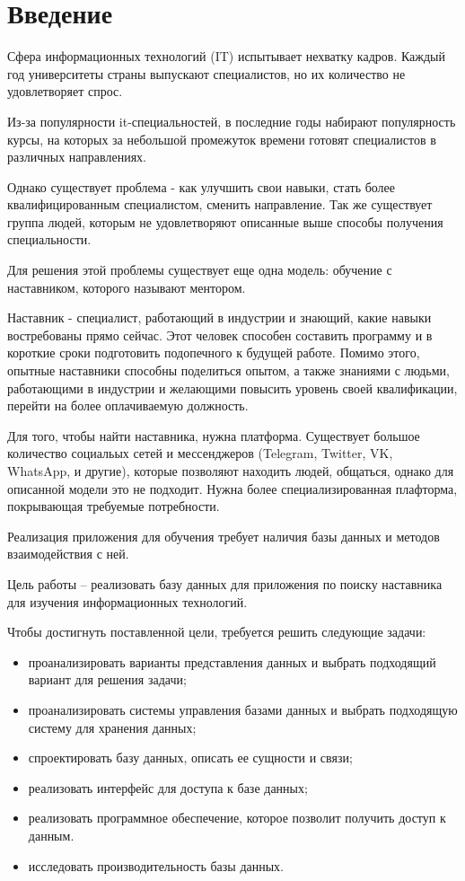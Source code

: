 \chapter*{Введение}

Сфера информационных технологий (IT) испытывает нехватку кадров. Каждый год университеты страны выпускают специалистов, но их
количество не удовлетворяет спрос.

Из-за популярности it-специальностей, в последние годы набирают популярность курсы, на которых за небольшой промежуток времени
готовят специалистов в различных направлениях.

Однако существует проблема - как улучшить свои навыки, стать более квалифицированным специалистом, сменить направление.
Так же существует группа людей, которым не удовлетворяют описанные выше способы получения специальности.

Для решения этой проблемы существует еще одна модель: обучение с наставником, которого называют ментором.

Наставник - специалист, работающий в индустрии и знающий, какие навыки востребованы прямо сейчас. Этот человек
способен составить программу и в короткие сроки подготовить подопечного к будущей работе.
Помимо этого, опытные наставники способны поделиться опытом, а также знаниями с людьми, работающими в индустрии и желающими
повысить уровень своей квалификации, перейти на более оплачиваемую должность.

Для того, чтобы найти наставника, нужна платформа.
Существует большое количество социальых сетей и мессенджеров (Telegram, Twitter, VK, WhatsApp, и другие),
которые позволяют находить людей, общаться, однако для описанной модели это не подходит. Нужна более специализированная
плафторма, покрывающая требуемые потребности.

Реализация приложения для обучения требует наличия базы данных и методов взаимодействия с ней.

Цель работы -- реализовать базу данных для приложения по поиску наставника для изучения информационных технологий.

Чтобы достигнуть поставленной цели, требуется решить следующие задачи:

\begin{itemize}
    \item проанализировать варианты представления данных и выбрать подходящий вариант для решения задачи;
    \item проанализировать системы управления базами данных и выбрать подходящую систему для хранения данных;
    \item спроектировать базу данных, описать ее сущности и связи;
    \item реализовать интерфейс для доступа к базе данных;
    \item реализовать программное обеспечение, которое позволит получить доступ к данным.
    \item исследовать производительность базы данных.
\end{itemize}